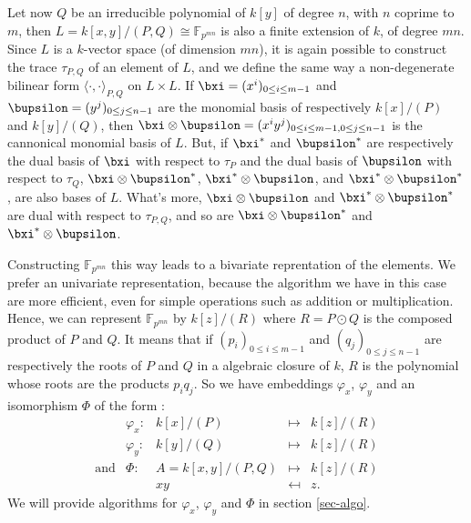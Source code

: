 \documentclass[a4paper,11pt]{article}
\theoremstyle{break}
\theoremstyle{definition}
\theoremstyle{remark}
\newcommand{\ps}[2]{\langle#1,#2\rangle}
\newcommand{\psdot}{\ps{\cdot}{\cdot}}
\begin{document}
Let now $Q$ be an irreducible polynomial of $k[y]$ of degree $n$, with $n$
coprime to $m$, then $L=k[x,y]/(P,Q)\cong \mathbb{F}_{p^{mn}}$ is also a finite 
extension of $k$, of
degree $mn$. Since $L$ is a $k$-vector space (of dimension $mn$), it is again
possible to construct the trace $\tau_{P,Q}$ of an element of $L$, and we define 
the same way
a non-degenerate bilinear form $\psdot_{P,Q}$ on $L\times L$. If
$\bxi=(x^i)_{0\leq i\leq m-1}$ and $\bupsilon=(y^j)_{0\leq j \leq n-1}$ are the
monomial basis of respectively $k[x]/(P)$ and $k[y]/(Q)$, then
$\bxi\otimes\bupsilon=(x^iy^j)_{0\leq i \leq m-1,0\leq j \leq n-1}$ is the
cannonical monomial basis of $L$. But, if $\bxi^*$ and $\bupsilon^*$ are
respectively the dual basis of $\bxi$ with respect to $\tau_P$ and the dual
basis of $\bupsilon$ with respect to $\tau_Q$, $\bxi\otimes\bupsilon^*$, 
$\bxi^*\otimes\bupsilon$, and $\bxi^*\otimes\bupsilon^*$, are also bases of $L$.
What's more, $\bxi\otimes\bupsilon$ and  $\bxi^*\otimes\bupsilon^*$ are dual
with respect to $\tau_{P,Q}$, and so are $\bxi\otimes\bupsilon^*$ and
$\bxi^*\otimes\bupsilon$.

Constructing
$\mathbb{F}_{p^{mn}}$ this way leads to a bivariate reprentation of the
elements. We prefer an univariate representation, because the algorithm we have
in this case are more efficient, even for simple operations such as addition or
multiplication. Hence, we can represent $\mathbb{F}_{p^{mn}}$ by $k[z]/(R)$
where $R=P\odot Q$ is the composed product of $P$ and $Q$. It means that if
$(p_i)_{0\leq i \leq m-1}$ and $(q_j)_{0\leq j\leq n-1}$ are respectively the
roots of $P$ and $Q$ in a algebraic closure of $k$, $R$ is the polynomial whose
roots are the products $p_iq_j$. So we have embeddings $\varphi_x$, $\varphi_y$
and an isomorphism $\Phi$ of the form :
\[
\begin{array}{ccccc}
  &\varphi_x: & k[x]/(P) & \mapsto & k[z]/(R)\\[2mm]
  & \varphi_y: & k[y]/(Q) & \mapsto & k[z]/(R)\\[2mm]
  \text{and}& \Phi:&  A=k[x,y]/(P,Q) & \mapsto & k[z]/(R) \\
  & &  xy & \mapsfrom & z.
\end{array}
\]
We will provide algorithms for $\varphi_x$, $\varphi_y$ and $\Phi$ in section
\ref{sec-algo}.
\end{document}
